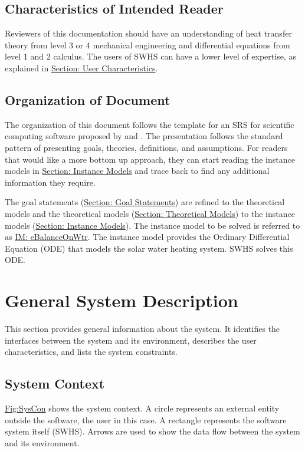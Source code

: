 \documentclass[12pt]{article}
\begin{document}
\subsection{Characteristics of Intended Reader}
\label{Sec:ReaderChars}
Reviewers of this documentation should have an understanding of heat transfer theory from level 3 or 4 mechanical engineering and differential equations from level 1 and 2 calculus. The users of SWHS can have a lower level of expertise, as explained in \hyperref[Sec:UserChars]{Section: User Characteristics}.

\subsection{Organization of Document}
\label{Sec:DocOrg}
The organization of this document follows the template for an SRS for scientific computing software proposed by \cite{dParnas1972} and \cite{parnasClements1984}. The presentation follows the standard pattern of presenting goals, theories, definitions, and assumptions. For readers that would like a more bottom up approach, they can start reading the instance models in \hyperref[Sec:IMs]{Section: Instance Models} and trace back to find any additional information they require.

The goal statements (\hyperref[Sec:GoalStmt]{Section: Goal Statements}) are refined to the theoretical models and the theoretical models (\hyperref[Sec:TMs]{Section: Theoretical Models}) to the instance models (\hyperref[Sec:IMs]{Section: Instance Models}). The instance model to be solved is referred to as \hyperref[IM:eBalanceOnWtr]{IM: eBalanceOnWtr}. The instance model provides the Ordinary Differential Equation (ODE) that models the solar water heating system. SWHS solves this ODE.

\section{General System Description}
\label{Sec:GenSysDesc}
This section provides general information about the system. It identifies the interfaces between the system and its environment, describes the user characteristics, and lists the system constraints.

\subsection{System Context}
\label{Sec:SysContext}
\hyperref[Figure:SysCon]{Fig:SysCon} shows the system context. A circle represents an external entity outside the software, the user in this case. A rectangle represents the software system itself (SWHS). Arrows are used to show the data flow between the system and its environment.
\end{document}
